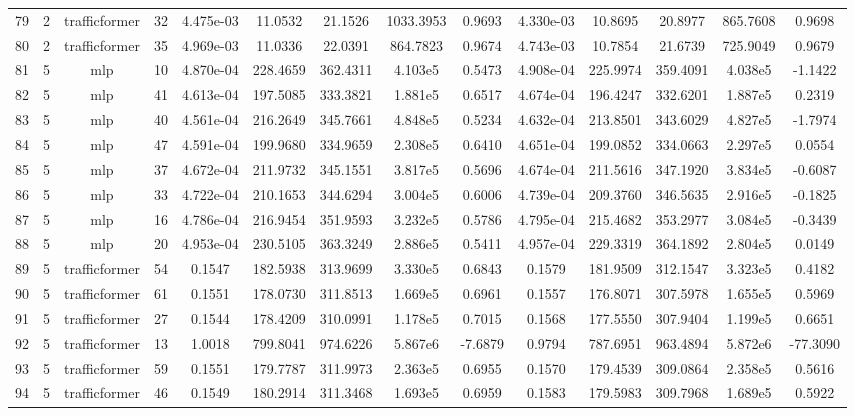 \begin{landscape}
\begin{longtable}{c c c c c c c c c c c c c c}
	79 & 2 & trafficformer & 32 & 4.475e-03 & 11.0532 & 21.1526 & 1033.3953 & 0.9693 & 4.330e-03 & 10.8695 & 20.8977 & 865.7608 & 0.9698 \\
	80 & 2 & trafficformer & 35 & 4.969e-03 & 11.0336 & 22.0391 & 864.7823 & 0.9674 & 4.743e-03 & 10.7854 & 21.6739 & 725.9049 & 0.9679 \\
	81 & 5 & mlp & 10 & 4.870e-04 & 228.4659 & 362.4311 & 4.103e5 & 0.5473 & 4.908e-04 & 225.9974 & 359.4091 & 4.038e5 & -1.1422 \\
	82 & 5 & mlp & 41 & 4.613e-04 & 197.5085 & 333.3821 & 1.881e5 & 0.6517 & 4.674e-04 & 196.4247 & 332.6201 & 1.887e5 & 0.2319 \\
	83 & 5 & mlp & 40 & 4.561e-04 & 216.2649 & 345.7661 & 4.848e5 & 0.5234 & 4.632e-04 & 213.8501 & 343.6029 & 4.827e5 & -1.7974 \\
	84 & 5 & mlp & 47 & 4.591e-04 & 199.9680 & 334.9659 & 2.308e5 & 0.6410 & 4.651e-04 & 199.0852 & 334.0663 & 2.297e5 & 0.0554 \\
	85 & 5 & mlp & 37 & 4.672e-04 & 211.9732 & 345.1551 & 3.817e5 & 0.5696 & 4.674e-04 & 211.5616 & 347.1920 & 3.834e5 & -0.6087 \\
	86 & 5 & mlp & 33 & 4.722e-04 & 210.1653 & 344.6294 & 3.004e5 & 0.6006 & 4.739e-04 & 209.3760 & 346.5635 & 2.916e5 & -0.1825 \\
	87 & 5 & mlp & 16 & 4.786e-04 & 216.9454 & 351.9593 & 3.232e5 & 0.5786 & 4.795e-04 & 215.4682 & 353.2977 & 3.084e5 & -0.3439 \\
	88 & 5 & mlp & 20 & 4.953e-04 & 230.5105 & 363.3249 & 2.886e5 & 0.5411 & 4.957e-04 & 229.3319 & 364.1892 & 2.804e5 & 0.0149 \\
	89 & 5 & trafficformer & 54 & 0.1547 & 182.5938 & 313.9699 & 3.330e5 & 0.6843 & 0.1579 & 181.9509 & 312.1547 & 3.323e5 & 0.4182 \\
	90 & 5 & trafficformer & 61 & 0.1551 & 178.0730 & 311.8513 & 1.669e5 & 0.6961 & 0.1557 & 176.8071 & 307.5978 & 1.655e5 & 0.5969 \\
	91 & 5 & trafficformer & 27 & 0.1544 & 178.4209 & 310.0991 & 1.178e5 & 0.7015 & 0.1568 & 177.5550 & 307.9404 & 1.199e5 & 0.6651 \\
	92 & 5 & trafficformer & 13 & 1.0018 & 799.8041 & 974.6226 & 5.867e6 & -7.6879 & 0.9794 & 787.6951 & 963.4894 & 5.872e6 & -77.3090 \\
	93 & 5 & trafficformer & 59 & 0.1551 & 179.7787 & 311.9973 & 2.363e5 & 0.6955 & 0.1570 & 179.4539 & 309.0864 & 2.358e5 & 0.5616 \\
	94 & 5 & trafficformer & 46 & 0.1549 & 180.2914 & 311.3468 & 1.693e5 & 0.6959 & 0.1583 & 179.5983 & 309.7968 & 1.689e5 & 0.5922 \\

\end{longtable}
\end{landscape}
